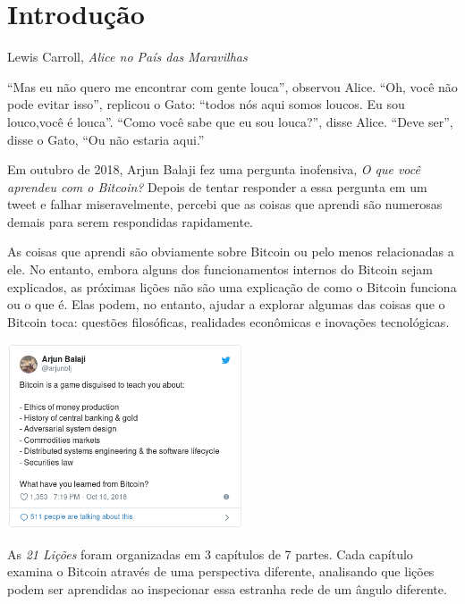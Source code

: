\chapter*{Introdução}
\label{ch:introduction}


\begin{chapquote}{Lewis Carroll, \textit{Alice no País das Maravilhas}}

\enquote{Mas eu não quero me encontrar com gente louca}, observou Alice. \enquote{Oh, você não pode evitar isso}, replicou o Gato: \enquote{todos nós aqui somos loucos. Eu sou louco,você é louca}. \enquote{Como você sabe que eu sou louca?}, disse Alice. \enquote{Deve ser}, disse o Gato, \enquote{Ou não estaria aqui.}
\end{chapquote}

Em outubro de 2018, Arjun Balaji fez uma pergunta inofensiva, \textit {O que você aprendeu com o Bitcoin?} Depois de tentar responder a essa pergunta em um tweet e falhar miseravelmente, percebi que as coisas que aprendi são numerosas demais para serem respondidas rapidamente.

As coisas que aprendi são obviamente sobre Bitcoin ou pelo menos relacionadas a ele. No entanto, embora alguns dos funcionamentos internos do Bitcoin sejam explicados, as próximas lições não são uma explicação de como o Bitcoin funciona ou o que é. Elas podem, no entanto, ajudar a explorar algumas das coisas que o Bitcoin toca: questões filosóficas, realidades econômicas e inovações tecnológicas.

\begin{center}
  \includegraphics[width=7cm]{assets/images/the-tweet.png}
\end{center}

As \textit {21 Lições} foram organizadas em 3 capítulos de 7 partes. Cada capítulo examina o Bitcoin através de uma perspectiva diferente, analisando que lições podem ser aprendidas ao inspecionar essa estranha rede de um ângulo diferente.

